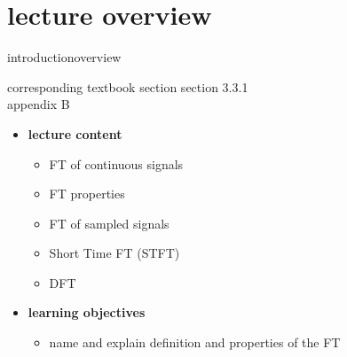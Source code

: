 


\subtitle{Module 3.3.1: Time-Frequency Representations~---~Fourier Transform}


	

    \section[overview]{lecture overview}
        \begin{frame}{introduction}{overview}
            \begin{block}{corresponding textbook section}
                    section 3.3.1\\
                    appendix B
            \end{block}

            \begin{itemize}
                \item   \textbf{lecture content}
                    \begin{itemize}
                        \item   FT of continuous signals  
                        \item   FT properties
                        \item   FT of sampled signals
                        \item   Short Time FT (STFT)
                        \item   DFT
                    \end{itemize}
                \bigskip
                \item<2->   \textbf{learning objectives}
                    \begin{itemize}
                        \item   name and explain definition and properties of the FT
                    \end{itemize}
            \end{itemize}
        \end{frame}

